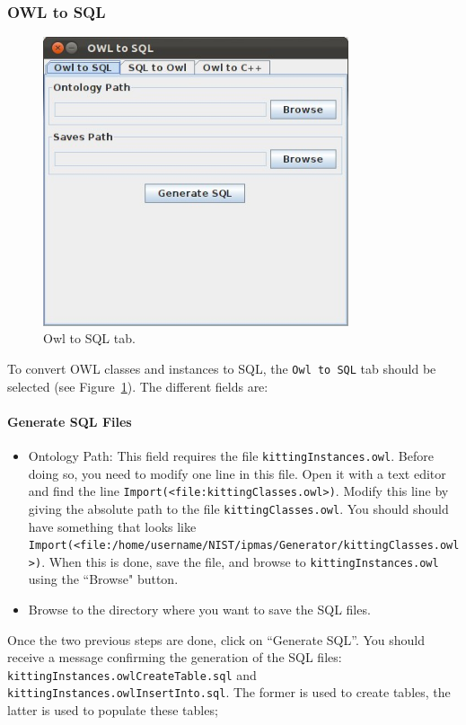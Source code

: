 \subsubsection{OWL to SQL}
\begin{figure}[h!t!]
\centering
\includegraphics[width=9cm]{Figure/OWLtoSQL001.jpeg}
\caption{Owl to SQL tab.}
\label{fig:owl2sql}
\end{figure}
To convert OWL classes and instances to SQL, the \texttt{Owl to SQL} tab should be selected (see Figure~\ref{fig:owl2sql}). The different fields are:

\paragraph{Generate SQL Files}
\begin{itemize}
 \item Ontology Path: This field requires the file \texttt{kittingInstances.owl}. Before doing so, you need to modify one line in this file. Open it with a text editor and find the line \texttt{Import(<file:kittingClasses.owl>)}. Modify
this line by giving the absolute path to the file \texttt{kittingClasses.owl}. You should should have something that looks like \texttt{Import(<file:/home/username/NIST/ipmas/Generator/kittingClasses.owl>)}. When this is done, save the file, and browse to  \texttt{kittingInstances.owl} using the ``Browse" button.
 \item Browse to the directory where you want to save the SQL files.
\end{itemize}

Once the two previous steps are done, click on ``Generate SQL''. You should receive a message confirming the generation of the SQL files: \texttt{kittingInstances.owlCreateTable.sql} and \texttt{kittingInstances.owlInsertInto.sql}. The former is used to create tables, the latter is used to populate these tables;

